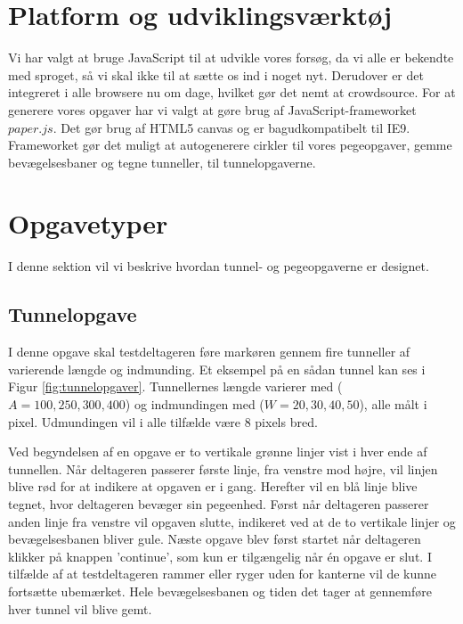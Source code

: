 \section*{Platform og udviklingsværktøj}
Vi har valgt at bruge JavaScript til at udvikle vores forsøg, da vi alle er bekendte med sproget, så vi skal ikke til at sætte os ind i noget nyt. Derudover er det integreret i alle browsere nu om dage, hvilket gør det nemt at crowdsource. For at generere vores opgaver har vi valgt at gøre brug af JavaScript-frameworket $paper.js$. Det gør brug af HTML5 canvas og er bagudkompatibelt til IE9. Frameworket gør det muligt at autogenerere cirkler til vores pegeopgaver, gemme bevægelsesbaner og tegne tunneller, til tunnelopgaverne.

\section*{Opgavetyper}
I denne sektion vil vi beskrive hvordan tunnel- og pegeopgaverne er designet.

\subsection*{Tunnelopgave}
I denne opgave skal testdeltageren føre markøren gennem fire tunneller af varierende længde og indmunding. Et eksempel på en sådan tunnel kan ses i Figur \ref{fig:tunnelopgaver}. Tunnellernes længde varierer med ($A = 100, 250, 300, 400$) og indmundingen med ($W = 20, 30 ,40, 50$), alle målt i pixel. Udmundingen vil i alle tilfælde være 8 pixels bred.

Ved begyndelsen af en opgave er to vertikale grønne linjer vist i hver ende af tunnellen. Når deltageren passerer første linje, fra venstre mod højre, vil linjen blive rød for at indikere at opgaven er i gang. Herefter vil en blå linje blive tegnet, hvor deltageren bevæger sin pegeenhed. Først når deltageren passerer anden linje fra venstre vil opgaven slutte, indikeret ved at de to vertikale linjer og bevægelsesbanen bliver gule. Næste opgave blev først startet når deltageren klikker på knappen 'continue', som kun er tilgængelig når én opgave er slut. I tilfælde af at testdeltageren rammer eller ryger uden for kanterne vil de kunne fortsætte ubemærket. Hele bevægelsesbanen og tiden det tager at gennemføre hver tunnel vil blive gemt.\\


